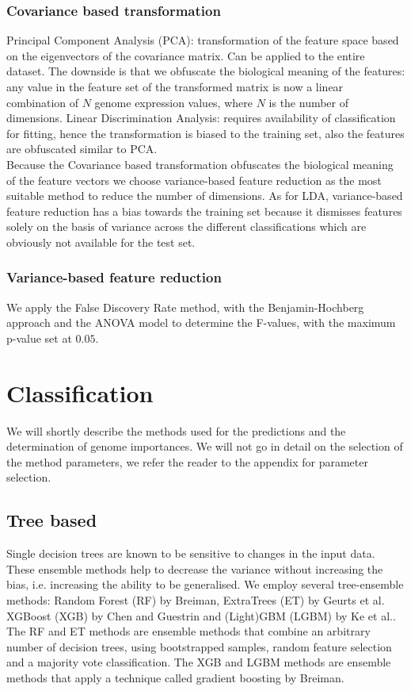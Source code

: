 \documentclass[a4paper,10pt]{article}
\begin{document}
\subsubsection{Covariance based transformation}


Principal Component Analysis (PCA): transformation of the feature space based on the eigenvectors 
of the covariance matrix. Can be applied to the entire dataset.  The downside is that we obfuscate the 
biological meaning of the features: any value in the feature set of the transformed matrix is now a linear combination 
of $N$ genome expression values, where $N$ is the number of dimensions. 
Linear Discrimination Analysis: requires availability of classification for fitting, hence
the transformation is biased to the training set, also the features are obfuscated similar to PCA. \\
Because the Covariance based transformation obfuscates the biological meaning of the feature vectors 
we choose variance-based feature reduction as the most suitable method to reduce the number of dimensions.
As for LDA, variance-based feature reduction has a bias towards the training set because it dismisses features solely
on the basis of variance across the different classifications which are obviously not available for the test set.

\subsubsection{Variance-based feature reduction}

We apply the False Discovery Rate method, with the Benjamin-Hochberg approach and the ANOVA model
to determine the F-values, with the maximum p-value set at $0.05$. %
%
\section{Classification}
%
We will shortly describe the methods used for the predictions and the determination of genome importances.
We will not go in detail on the selection of the method parameters, we refer the reader to the appendix for 
parameter selection.

\subsection{Tree based}

Single decision trees are known to be sensitive to changes in the input data. These ensemble methods 
help to decrease the variance without increasing the bias, i.e. increasing the ability to be generalised.
We employ several tree-ensemble methods: Random Forest (RF) by Breiman\cite{Breiman2001}, ExtraTrees (ET) by Geurts et al.\cite{Geurts2006} 
XGBoost (XGB) by Chen and Guestrin\cite{Chen2016} and (Light)GBM (LGBM) by Ke et al.\cite{Ke2017}.
The RF and ET methods are ensemble methods that combine an arbitrary number of decision trees, using bootstrapped samples,
random feature selection and a majority vote classification. The XGB and LGBM methods are ensemble methods 
that apply a technique called gradient boosting by Breiman\cite{Breiman1997}.
%
\end{document}
